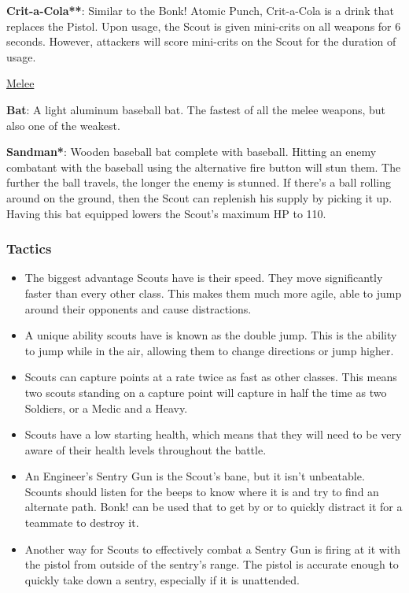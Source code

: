 {\bf Crit-a-Cola**}: Similar to the Bonk! Atomic Punch, Crit-a-Cola is a drink that replaces the Pistol.  Upon usage, the Scout is given mini-crits on all weapons for 6 seconds.  However, attackers will score mini-crits on the Scout for the duration of usage.

\newpage


\begin {center}
\underline {Melee}
\end {center}

{\bf Bat}: A light aluminum baseball bat. The fastest of all the melee weapons, but also one of the weakest.

{\bf Sandman*}: Wooden baseball bat complete with baseball. Hitting an enemy combatant with the baseball using the alternative fire button will stun them. The further the ball travels, the longer the enemy is stunned. If there's a ball rolling around on the ground, then the Scout can replenish his supply by picking it up. Having this bat equipped lowers the Scout’s maximum HP to 110. 

\subsubsection {Tactics}
\begin {itemize}
\item The biggest advantage Scouts have is their speed. They move significantly faster than every other class. This makes them much more agile, able to jump around their opponents and cause distractions.

\item A unique ability scouts have is known as the double jump.  This is the ability to jump while in the air, allowing them to change directions or jump higher.

\item Scouts can capture points at a rate twice as fast as other classes.  This means two scouts standing on a capture point will capture in half the time as two Soldiers, or a Medic and a Heavy.

\item Scouts have a low starting health, which means that they will need to be very aware of their health levels throughout the battle.  

\item An Engineer's Sentry Gun is the Scout's bane, but it isn't unbeatable. Scounts should listen for the beeps to know where it is and try to find an alternate path. Bonk! can be used that to get by or to quickly distract it for a teammate to destroy it.

\item Another way for Scouts to effectively combat a Sentry Gun is firing at it with the pistol from outside of the sentry's range. The pistol is accurate enough to quickly take down a sentry, especially if it is unattended.
\end {itemize}